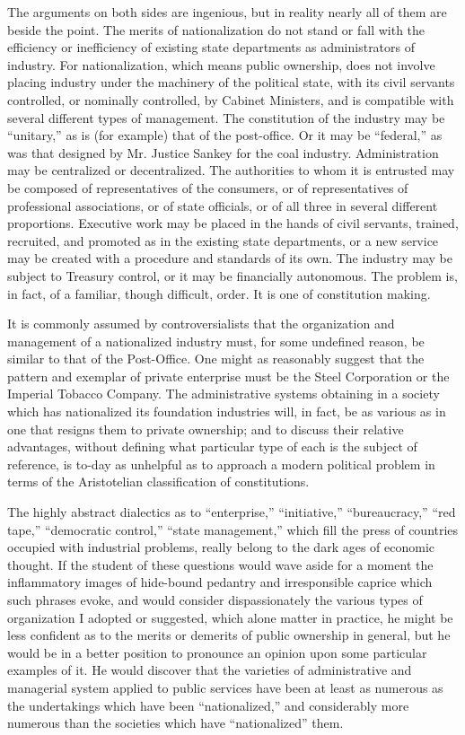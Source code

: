 \documentclass{book}
\begin{document}
The arguments on both sides are ingenious, but in reality nearly all of them are beside the point. The merits of nationalization do not stand or fall with the efficiency or inefficiency of existing state departments as administrators of industry. For nationalization, which means public ownership, does not involve placing industry under the machinery of the political state, with its civil servants controlled, or nominally controlled, by Cabinet Ministers, and is compatible with several different types of management. The constitution of the industry may be “unitary,” as is (for example) that of the post-office. Or it may be “federal,” as was that designed by Mr. Justice Sankey for the coal industry. Administration may be centralized or decentralized. The authorities to whom it is entrusted may be composed of representatives of the consumers, or of representatives of professional associations, or of state officials, or of all three in several different proportions. Executive work may be placed in the hands of civil servants, trained, recruited, and promoted as in the existing state departments, or a new service may be created with a procedure and standards of its own. The industry may be subject to Treasury control, or it may be financially autonomous. The problem is, in fact, of a familiar, though difficult, order. It is one of constitution making.

It is commonly assumed by controversialists that the organization and management of a nationalized industry must, for some undefined reason, be similar to that of the Post-Office. One might as reasonably suggest that the pattern and exemplar of private enterprise must be the Steel Corporation or the Imperial Tobacco Company. The administrative systems obtaining in a society which has nationalized its foundation industries will, in fact, be as various as in one that resigns them to private ownership; and to discuss their relative advantages, without defining what particular type of each is the subject of reference, is to-day as unhelpful as to approach a modern political problem in terms of the Aristotelian classification of constitutions.

The highly abstract dialectics as to “enterprise,” “initiative,” “bureaucracy,” “red tape,” “democratic control,” “state management,” which fill the press of countries occupied with industrial problems, really belong to the dark ages of economic thought. If the student of these questions would wave aside for a moment the inflammatory images of hide-bound pedantry and irresponsible caprice which such phrases evoke, and would consider dispassionately the various types of organization I adopted or suggested, which alone matter in practice, he might be less confident as to the merits or demerits of public ownership in general, but he would be in a better position to pronounce an opinion upon some particular examples of it. He would discover that the varieties of administrative and managerial system applied to public services have been at least as numerous as the undertakings which have been “nationalized,” and considerably more numerous than the societies which have “nationalized” them.
\end{document}
